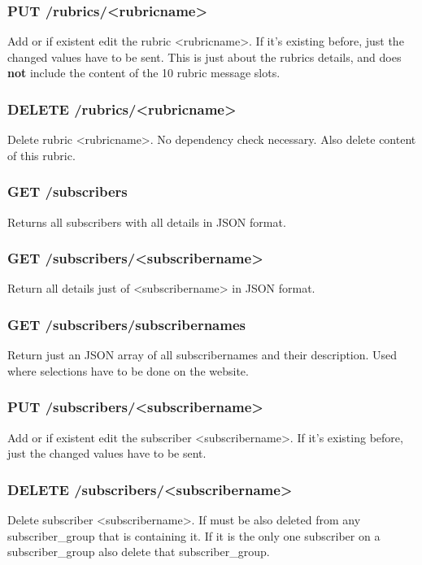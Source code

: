 \subsubsection{PUT /rubrics/<rubricname>}
Add or if existent edit the rubric <rubricname>. If it's existing before, just the changed values have to be sent. This is just about the rubrics details, and does \textbf{not} include the content of the 10 rubric message slots.

\subsubsection{DELETE /rubrics/<rubricname>}
Delete rubric <rubricname>. No dependency check necessary. Also delete content of this rubric.

\subsubsection{GET /subscribers}
Returns all subscribers with all details in JSON format.

\subsubsection{GET /subscribers/<subscribername>}
Return all details just of <subscribername> in JSON format.

\subsubsection{GET /subscribers/subscribernames}
Return just an JSON array of all subscribernames and their description. Used where selections have to be done on the website.

\subsubsection{PUT /subscribers/<subscribername>}
Add or if existent edit the subscriber <subscribername>. If it's existing before, just the changed values have to be sent.

\subsubsection{DELETE /subscribers/<subscribername>}
Delete subscriber <subscribername>. If must be also deleted from any subscriber\_group that is containing it. If it is the only one subscriber on a subscriber\_group also delete that subscriber\_group.

